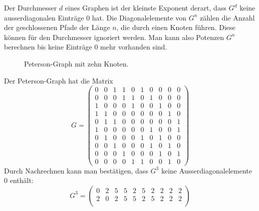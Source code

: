 Der Durchmesser $d$ eines Graphen ist der kleinste Exponent derart,
dass $G^d$ keine ausserdiagonalen Einträge $0$ hat.
Die Diagonalelemente von $G^n$ zählen die Anzahl der geschlossenen Pfade
der Länge $n$, die durch einen Knoten führen.
Diese können für den Durchmesser ignoriert werden.
Man kann also Potenzen $G^n$ berechnen bis keine Einträge $0$ mehr vorhanden
sind.

\begin{beispiel}
\begin{figure}
\centering
{}
\caption{Peterson-Graph mit zehn Knoten.
\label{buch:figure:peterson}}
\end{figure}
Der Peterson-Graph hat die Matrix
\[
G
=
\begin{pmatrix}
 0& 0& 1& 1& 0& 1& 0& 0& 0& 0\\ %
 0& 0& 0& 1& 1& 0& 1& 0& 0& 0\\ %
 1& 0& 0& 0& 1& 0& 0& 1& 0& 0\\ %
 1& 1& 0& 0& 0& 0& 0& 0& 1& 0\\ %
 0& 1& 1& 0& 0& 0& 0& 0& 0& 1\\ %
 1& 0& 0& 0& 0& 0& 1& 0& 0& 1\\ %
 0& 1& 0& 0& 0& 1& 0& 1& 0& 0\\ %
 0& 0& 1& 0& 0& 0& 1& 0& 1& 0\\ %
 0& 0& 0& 1& 0& 0& 0& 1& 0& 1\\ %
 0& 0& 0& 0& 1& 1& 0& 0& 1& 0   %
\end{pmatrix}
\]
Durch Nachrechnen kann man bestätigen, dass $G^3$ keine
Ausserdiagonalelemente $0$ enthält:
\[
G^3
=
\begin{pmatrix}
 0& 2& 5& 5& 2& 5& 2& 2& 2& 2\\
 2& 0& 2& 5& 5& 2& 5& 2& 2& 2\\

\end{pmatrix}\]
\end{beispiel}
